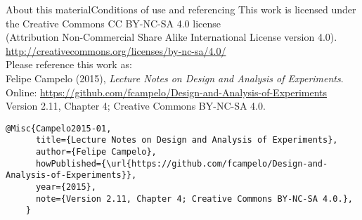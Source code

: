 \documentclass[t]{beamer}
\begin{document}
\begin{ftstf}{About this material}{Conditions of use and referencing}
\centering\footnotesize This work is licensed under the Creative Commons CC BY-NC-SA 4.0 license\\(Attribution Non-Commercial Share Alike International License version 4.0).\\
\vhalf
\url{http://creativecommons.org/licenses/by-nc-sa/4.0/}\\
\vone
\footnotesize Please reference this work as:\\
\footnotesize \flushleft Felipe Campelo (2015), \textit{Lecture Notes on Design and Analysis of Experiments}.\\Online: {\scriptsize\url{https://github.com/fcampelo/Design-and-Analysis-of-Experiments}}\\
Version 2.11, Chapter 4; Creative Commons BY-NC-SA 4.0.\\

\begin{Verbatim}[fontsize=\tiny]
    @Misc{Campelo2015-01,
      title={Lecture Notes on Design and Analysis of Experiments},
      author={Felipe Campelo},
      howPublished={\url{https://github.com/fcampelo/Design-and-Analysis-of-Experiments}},
      year={2015},
      note={Version 2.11, Chapter 4; Creative Commons BY-NC-SA 4.0.},
    }
\end{Verbatim}

\end{ftstf}
\end{document}

